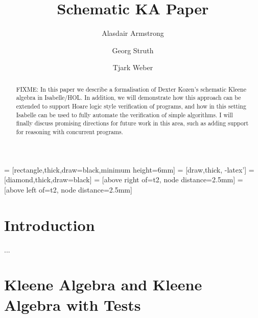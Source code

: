 \documentclass{llncs}
\begin{document}
 = [rectangle,thick,draw=black,minimum height=6mm]
 = [draw,thick, -latex']
 = [diamond,thick,draw=black]
 = [above right of=t2, node distance=2.5mm]
 = [above left of=t2, node distance=2.5mm]

\title{Schematic KA Paper}

\author{Alasdair Armstrong \and Georg Struth \and Tjark Weber}


\maketitle

\begin{abstract}
  FIXME: In this paper we describe a formalisation of Dexter Kozen's
  schematic Kleene algebra in Isabelle/HOL. In addition, we will
  demonstrate how this approach can be extended to support Hoare logic
  style verification of programs, and how in this setting Isabelle can
  be used to fully automate the verification of simple algorithms. I
  will finally discuss promising directions for future work in this
  area, such as adding support for reasoning with concurrent programs.
\end{abstract}

\section{Introduction}

\newpage
...
\pagebreak

\section{Kleene Algebra and Kleene Algebra with Tests}
\label{sec:alg}
\end{document}
